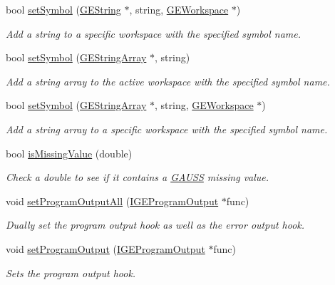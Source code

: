 \begin{DoxyCompactItemize}
bool \hyperlink{class_g_a_u_s_s_abc42f75d55ce90767d8c3842c00fd8bc}{set\-Symbol} (\hyperlink{class_g_e_string}{G\-E\-String} $\ast$, string, \hyperlink{class_g_e_workspace}{G\-E\-Workspace} $\ast$)
\begin{DoxyCompactList}\small\item\em Add a string to a specific workspace with the specified symbol name. \end{DoxyCompactList}\item 
bool \hyperlink{class_g_a_u_s_s_a9d471d25f4c5acd0a8917239234a5bf5}{set\-Symbol} (\hyperlink{class_g_e_string_array}{G\-E\-String\-Array} $\ast$, string)
\begin{DoxyCompactList}\small\item\em Add a string array to the active workspace with the specified symbol name. \end{DoxyCompactList}\item 
bool \hyperlink{class_g_a_u_s_s_aeeac3739521597a74a4eed3640ba1a04}{set\-Symbol} (\hyperlink{class_g_e_string_array}{G\-E\-String\-Array} $\ast$, string, \hyperlink{class_g_e_workspace}{G\-E\-Workspace} $\ast$)
\begin{DoxyCompactList}\small\item\em Add a string array to a specific workspace with the specified symbol name. \end{DoxyCompactList}\item 
bool \hyperlink{class_g_a_u_s_s_a3e665b3b7d0733f27ca56427e6ec3d49}{is\-Missing\-Value} (double)
\begin{DoxyCompactList}\small\item\em Check a double to see if it contains a \hyperlink{class_g_a_u_s_s}{G\-A\-U\-S\-S} missing value. \end{DoxyCompactList}\item 
void \hyperlink{class_g_a_u_s_s_a0b8379c48d677e05aeab433dba66fbb6}{set\-Program\-Output\-All} (\hyperlink{class_i_g_e_program_output}{I\-G\-E\-Program\-Output} $\ast$func)
\begin{DoxyCompactList}\small\item\em Dually set the program output hook as well as the error output hook. \end{DoxyCompactList}\item 
void \hyperlink{class_g_a_u_s_s_a7f0dc6b5b307aa06c347f9c6a9fdacab}{set\-Program\-Output} (\hyperlink{class_i_g_e_program_output}{I\-G\-E\-Program\-Output} $\ast$func)
\begin{DoxyCompactList}\small\item\em Sets the program output hook. \end{DoxyCompactList}\item 

\end{DoxyCompactItemize}
